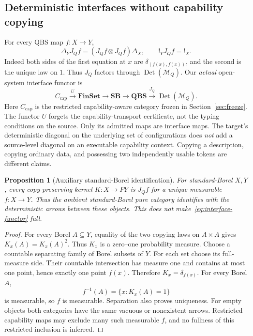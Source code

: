 \documentclass[11pt,a4paper]{article}
\newtheorem{proposition}[theorem]{Proposition}
\theoremstyle{definition}
\newcommand{\FinSet}{\mathbf{FinSet}}
\newcommand{\QBS}{\mathbf{QBS}}
\newcommand{\Det}{\operatorname{Det}}
\begin{document}
\subsection{Deterministic interfaces without capability copying}
For every QBS map $f:X\to Y$,
\begin{equation}\label{eq:deterministic}
 \Delta_Y J_Qf=(J_Qf\otimes J_Qf)\Delta_X,
 \qquad !_YJ_Qf=!_X.
\end{equation}
Indeed both sides of the first equation at $x$ are
$\delta_{(f(x),f(x))}$, and the second is the unique law on $1$.
Thus $J_Q$ factors through $\Det(\mathcal M_Q)$.
Our \emph{actual} open-system interface functor is
\begin{equation}\label{eq:interface-functor}
 C_{\mathrm{cap}}\xrightarrow{U}\FinSet
 \longrightarrow\mathbf{SB}\longrightarrow\QBS
 \xrightarrow{J_Q}\Det(\mathcal M_Q).
\end{equation}
Here $C_{\mathrm{cap}}$ is the restricted capability-aware category frozen in
Section~\ref{sec:freeze}. The functor $U$ forgets the capability-transport
certificate, not the typing conditions on the source. Only its admitted
maps are interface maps. The target's deterministic diagonal on the
underlying set of configurations does \emph{not} add a source-level diagonal
on an executable capability context. Copying a description, copying ordinary
data, and possessing two independently usable tokens are different claims.

\begin{proposition}[Auxiliary standard-Borel identification]
\label{prop:sb-det}
For standard-Borel $X,Y$, every copy-preserving kernel $K:X\to PY$ is
$J_Qf$ for a unique measurable $f:X\to Y$. Thus the ambient standard-Borel
pure category identifies with the deterministic arrows between these objects.
This does not make~\eqref{eq:interface-functor} full.
\end{proposition}
\begin{proof}
For every Borel $A\subseteq Y$, equality of the two copying laws on
$A\times A$ gives $K_x(A)=K_x(A)^2$. Thus $K_x$ is a zero--one probability
measure. Choose a countable separating family of Borel subsets of $Y$.
For each set choose its full-measure side. Their countable intersection has
measure one and contains at most one point, hence exactly one point $f(x)$.
Therefore $K_x=\delta_{f(x)}$. For every Borel $A$,
\[
 f^{-1}(A)=\{x:K_x(A)=1\}
\]
is measurable, so $f$ is measurable. Separation also proves uniqueness.
For empty objects both categories have the same vacuous or nonexistent
arrows. Restricted capability maps may exclude many such measurable $f$,
and no fullness of this restricted inclusion is inferred.
\end{proof}
\end{document}
